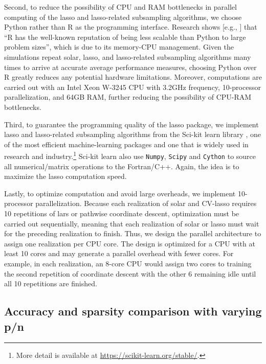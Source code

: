 \documentclass[11pt,authoryear]{elsarticle}
\begin{document}
Second, to reduce the possibility of CPU and RAM bottlenecks in parallel computing of the lasso and lasso-related subsampling algorithms, we choose Python rather than R as the programming interface. Research shows [e.g., \citet{donoho201750}]  that ``R has the well-known reputation of being less scalable than Python to large problem sizes'', which is  due to its memory-CPU management. Given the simulations repeat solar, lasso, and lasso-related subsampling algorithms many times to arrive at accurate average performance measures, choosing Python over R greatly reduces any potential hardware limitations. Moreover, computations are carried out with an Intel Xeon W-3245 CPU with 3.2GHz frequency, 10-processor parallelization, and 64GB RAM, further reducing the possibility of CPU-RAM bottlenecks.

Third, to guarantee the programming quality of the lasso package, we implement lasso and lasso-related subsampling algorithms from the {\sf Sci-kit learn} library \citep{scikit-learn}, one of the most efficient machine-learning packages and one that is widely used in research and industry.\footnote{More detail is available at \url{https://scikit-learn.org/stable/}.} {\sf Sci-kit learn} also use \texttt{Numpy}, \texttt{Scipy} and \texttt{Cython} to source all numerical/matrix operations to the Fortran/C++. Again, the idea is to maximize the lasso computation speed.

Lastly, to optimize computation and avoid large overheads, we implement 10-processor parallelization. Because each realization of solar and CV-lasso requires 10 repetitions of lars or pathwise coordinate descent, optimization must be carried out sequentially, meaning that each realization of solar or lasso must wait for the preceding realization to finish. Thus, we design the parallel architecture to assign one realization per CPU core. The design is optimized for a CPU with at least 10 cores and may generate a parallel overhead with fewer cores. For example, in each realization, an 8-core CPU would assign two cores to training the second repetition of coordinate descent with the other 6 remaining idle until all 10 repetitions are finished.

\subsection{Accuracy and sparsity comparison with varying p/n \label{subsection:suml1}}
\end{document}
